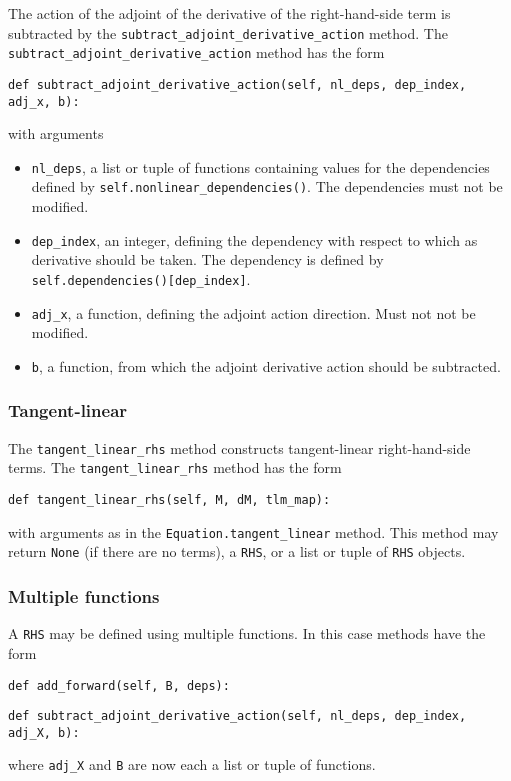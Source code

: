 \documentclass[11pt]{article}
\begin{document}
The action of the adjoint of the derivative of the right-hand-side term is
subtracted by the \texttt{subtract\_adjoint\_derivative\_action} method. The
\texttt{subtract\_adjoint\_derivative\_action} method has the form
\begin{lstlisting}
def subtract_adjoint_derivative_action(self, nl_deps, dep_index, adj_x, b):
\end{lstlisting}
with arguments
\begin{itemize}
  \item \texttt{nl\_deps}, a list or tuple of functions containing values for
    the dependencies defined by \texttt{self.nonlinear\_dependencies()}. The
    dependencies must not be modified.
  \item \texttt{dep\_index}, an integer, defining the dependency with respect
    to which as derivative should be taken. The dependency is defined by
    \texttt{self.dependencies()[dep\_index]}.
  \item \texttt{adj\_x}, a function, defining the adjoint action direction.
    Must not not be modified.
  \item \texttt{b}, a function, from which the adjoint derivative action should
    be subtracted.
\end{itemize}

\subsubsection{Tangent-linear}

The \texttt{tangent\_linear\_rhs} method constructs tangent-linear
right-hand-side terms. The \texttt{tangent\_linear\_rhs} method has the form
\begin{lstlisting}
def tangent_linear_rhs(self, M, dM, tlm_map):
\end{lstlisting}
with arguments as in the \texttt{Equation.tangent\_linear} method. This method
may return \texttt{None} (if there are no terms), a \texttt{RHS}, or a list or
tuple of \texttt{RHS} objects.

\subsubsection{Multiple functions}

A \texttt{RHS} may be defined using multiple functions. In this case methods
have the form
\begin{lstlisting}
def add_forward(self, B, deps):
\end{lstlisting}
\begin{lstlisting}
def subtract_adjoint_derivative_action(self, nl_deps, dep_index, adj_X, b):
\end{lstlisting}
where \texttt{adj\_X} and \texttt{B} are now each a list or tuple of functions. 
\end{document}
